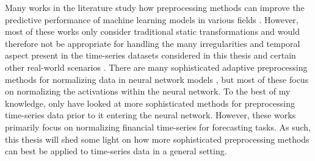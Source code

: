 \documentclass{statsmsc}
\begin{document}
{%

Many works in the literature study how preprocessing methods can improve the predictive performance
of machine learning models in various fields
\citep{preprocess_origin,nawi,singh,dain,bin,mixture_ct}. However, most of these works
\citep{preprocess_origin,nawi,singh,mixture_ct} only consider traditional static transformations
and would therefore not be appropriate for handling the many irregularities and temporal
aspect present in the  time-series datasets considered in this thesis and certain other
real-world scenarios \citep{nawi,dain,rdain,bin}.
There are many sophisticated adaptive preprocessing methods
for normalizing data in neural network models \citep{huang2020,yu2022,batchnorm}, but most
of these focus on normalizing the activations within the neural network.
To the best of my knowledge, only \cite{dain,rdain,bin} have looked at more sophisticated
methods for preprocessing time-series data prior to it entering the neural network.
However, these works primarily focus on normalizing financial time-series for
forecasting tasks. As such, this thesis will shed some light on how more sophisticated
preprocessing methods can best be applied to time-series data in a general setting.

}
\end{document}
